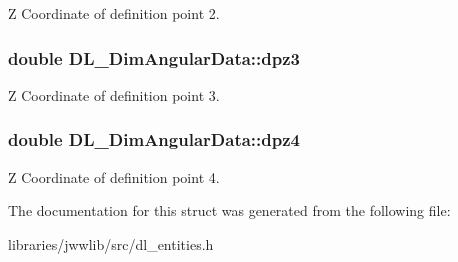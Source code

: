 Z Coordinate of definition point 2. \hypertarget{structDL__DimAngularData_ac62c7f55e9411fe242b730c250a1960c}{
\subsubsection[{dpz3}]{\setlength{\rightskip}{0pt plus 5cm}double D\-L\-\_\-\-Dim\-Angular\-Data\-::dpz3}}\label{structDL__DimAngularData_ac62c7f55e9411fe242b730c250a1960c}
Z Coordinate of definition point 3. \hypertarget{structDL__DimAngularData_af9cd075ea2f5fb874c237bab09f57bd2}{
\subsubsection[{dpz4}]{\setlength{\rightskip}{0pt plus 5cm}double D\-L\-\_\-\-Dim\-Angular\-Data\-::dpz4}}\label{structDL__DimAngularData_af9cd075ea2f5fb874c237bab09f57bd2}
Z Coordinate of definition point 4. 

The documentation for this struct was generated from the following file\-:\begin{DoxyCompactItemize}
\item 
libraries/jwwlib/src/dl\-\_\-entities.\-h\end{DoxyCompactItemize}
